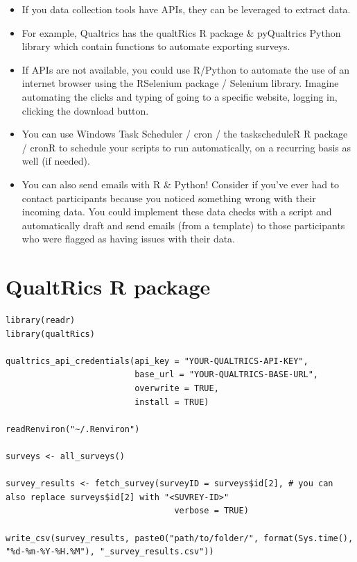 \documentclass[
  letterpaper,
  DIV=11,
  numbers=noendperiod]{scrreprt}
\begin{document}
\begin{itemize}
\item
  If you data collection tools have APIs, they can be leveraged to
  extract data.
\item
  For example, Qualtrics has the qualtRics R package \& pyQualtrics
  Python library which contain functions to automate exporting surveys.
\item
  If APIs are not available, you could use R/Python to automate the use
  of an internet browser using the RSelenium package / Selenium library.
  Imagine automating the clicks and typing of going to a specific
  website, logging in, clicking the download button.
\item
  You can use Windows Task Scheduler / cron / the taskscheduleR R
  package / cronR to schedule your scripts to run automatically, on a
  recurring basis as well (if needed).
\item
  You can also send emails with R \& Python! Consider if you've ever had
  to contact participants because you noticed something wrong with their
  incoming data. You could implement these data checks with a script and
  automatically draft and send emails (from a template) to those
  participants who were flagged as having issues with their data.
\end{itemize}

\section*{QualtRics R package}\label{qualtrics-r-package}


\begin{verbatim}
library(readr)
library(qualtRics)

qualtrics_api_credentials(api_key = "YOUR-QUALTRICS-API-KEY", 
                          base_url = "YOUR-QUALTRICS-BASE-URL",
                          overwrite = TRUE,
                          install = TRUE)

readRenviron("~/.Renviron")

surveys <- all_surveys() 

survey_results <- fetch_survey(surveyID = surveys$id[2], # you can also replace surveys$id[2] with "<SUVREY-ID>" 
                                  verbose = TRUE)

write_csv(survey_results, paste0("path/to/folder/", format(Sys.time(), "%d-%m-%Y-%H.%M"), "_survey_results.csv"))
\end{verbatim}
\end{document}
